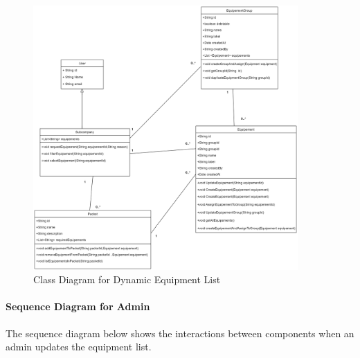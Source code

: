 \begin{figure}[H]
    \centering
    \includegraphics[width=0.9\textwidth]{src/assets/diagrams/DynamiEquipementList.png}
    \caption{Class Diagram for Dynamic Equipment List}
    \label{fig:class_diagram}
\end{figure}
 

\paragraph{Sequence Diagram for Admin}
The sequence diagram below shows the interactions between components when an admin updates the equipment list.

